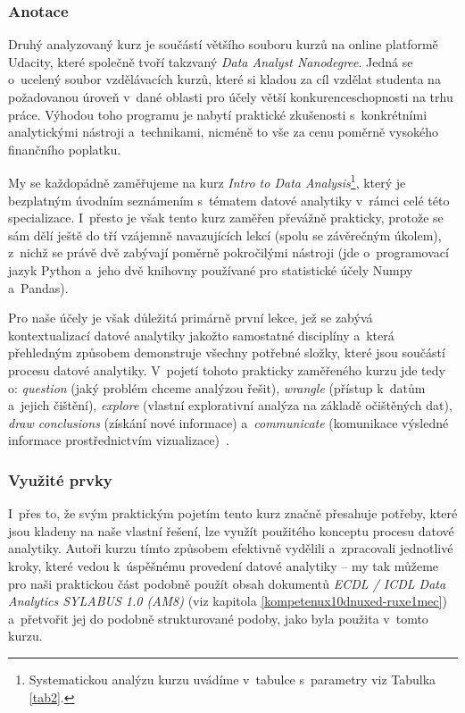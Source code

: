 \hypertarget{anotace-1}{%
\subsubsection{Anotace}\label{anotace-1}}

Druhý analyzovaný kurz je součástí většího souboru kurzů na online platformě Udacity, které společně tvoří takzvaný \emph{Data Analyst Nanodegree}. Jedná se o~ucelený soubor vzdělávacích kurzů, které si kladou za cíl vzdělat studenta na požadovanou úroveň v~dané oblasti pro účely větší konkurenceschopnosti na trhu práce. Výhodou toho programu je nabytí praktické zkušenosti s~konkrétními analytickými nástroji a~technikami, nicméně to vše za cenu poměrně vysokého finančního poplatku.

My se každopádně zaměřujeme na kurz \emph{Intro to Data Analysis}\footnote{Systematickou analýzu kurzu uvádíme v~tabulce s~parametry viz Tabulka \ref{tab2}.}, který je bezplatným úvodním seznámením s~tématem datové analytiky v~rámci celé této specializace. I~přesto je však tento kurz zaměřen převážně prakticky, protože se sám dělí ještě do tří vzájemně navazujících lekcí (spolu se závěrečným úkolem), z~nichž se právě dvě zabývají poměrně pokročilými nástroji (jde o~programovací jazyk Python a~jeho dvě knihovny používané pro statistické účely Numpy a~Pandas).

Pro naše účely je však důležitá primárně první lekce, jež se zabývá kontextualizací datové analytiky jakožto samostatné disciplíny a~která přehledným způsobem demonstruje všechny potřebné složky, které jsou součástí procesu datové analytiky. V~pojetí tohoto prakticky zaměřeného kurzu jde tedy o: \emph{question} (jaký problém chceme analýzou řešit), \emph{wrangle} (přístup k~datům a~jejich čištění), \emph{explore} (vlastní explorativní analýza na základě očištěných dat), \emph{draw conclusions} (získání nové informace) a~\emph{communicate} (komunikace výsledné informace prostřednictvím vizualizace)~\parencite{course2}.

\hypertarget{vyuux17eituxe9-prvky-1}{%
\subsubsection{Využité prvky}\label{vyuux17eituxe9-prvky-1}}

I~přes to, že svým praktickým pojetím tento kurz značně přesahuje potřeby, které jsou kladeny na naše vlastní řešení, lze využít použitého konceptu procesu datové analytiky. Autoři kurzu tímto způsobem efektivně vydělili a~zpracovali jednotlivé kroky, které vedou k~úspěšnému provedení datové analytiky -- my tak můžeme pro naši praktickou část podobně použít obsah dokumentů \emph{ECDL / ICDL Data Analytics SYLABUS 1.0 (AM8)} (viz kapitola \ref{kompetenux10dnuxed-ruxe1mec}) a~přetvořit jej do podobně strukturované podoby, jako byla použita v~tomto kurzu.

